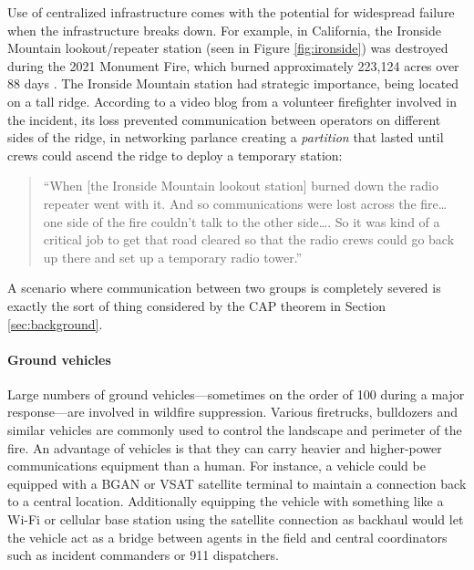 \documentclass[]             %
{NASA}                       %
\theoremstyle{definition}
\begin{document}
Use of centralized infrastructure comes with the potential for
widespread failure when the infrastructure breaks down. For example,
in California, the Ironside Mountain lookout/repeater station (seen in
Figure \ref{fig:ironside}) was destroyed during the 2021 Monument
Fire, which burned approximately 223,124 acres over 88 days
\cite{2021:monumentfire}. The Ironside Mountain station had strategic
importance, being located on a tall ridge. According to a video blog
from a volunteer firefighter involved in the incident, its loss
prevented communication between operators on different sides of the
ridge, in networking parlance creating a \emph{partition} that lasted
until crews could ascend the ridge to deploy a temporary station:
\begin{quote}
  ``When {[}the Ironside Mountain lookout station{]} burned down the
  radio repeater went with it. And so communications were lost across
  the fire\ldots{} one side of the fire couldn't talk to the other
  side\ldots.  So it was kind of a critical job to get that road
  cleared so that the radio crews could go back up there and set up a
  temporary radio tower.'' \cite{2022:mechfire}%
\end{quote}
A scenario where communication between two groups is completely
severed is exactly the sort of thing considered by the CAP theorem in
Section \ref{sec:background}.

\paragraph{Ground vehicles}
Large numbers of ground vehicles---sometimes on the order of 100
during a major response---are involved in wildfire
suppression. Various firetrucks, bulldozers and similar vehicles are
commonly used to control the landscape and perimeter of the fire. An
advantage of vehicles is that they can carry heavier and higher-power
communications equipment than a human. For instance, a vehicle could
be equipped with a BGAN or VSAT satellite terminal to maintain a
connection back to a central location. Additionally equipping the
vehicle with something like a Wi-Fi or cellular base station using the
satellite connection as backhaul would let the vehicle act as a bridge
between agents in the field and central coordinators such as incident
commanders or 911 dispatchers.
\end{document}
